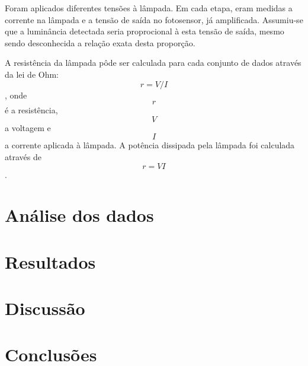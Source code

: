 \documentclass[brazilian,12pt,a4paper,final]{article}
\begin{document}
Foram aplicados diferentes tensões à lâmpada.
Em cada etapa, eram medidas a corrente na lâmpada e a tensão de saída no fotosensor, já amplificada.
Assumiu-se que a luminância detectada seria proprocional à esta tensão de saída, mesmo sendo desconhecida 
a relação exata desta proporção.

A resistência da lâmpada pôde ser calculada para cada conjunto de dados através da lei de Ohm: $$ r=V/I $$, 
onde $$r$$ é a resistência, $$V$$ a voltagem e $$I$$ a corrente aplicada à lâmpada. 
A potência dissipada pela lâmpada foi calculada através de $$ r=VI $$.



\section{Análise dos dados}

\section{Resultados}

\section{Discussão}

\section{Conclusões}


\begin{thebibliography}{99}
\end{thebibliography}
\end{document}
